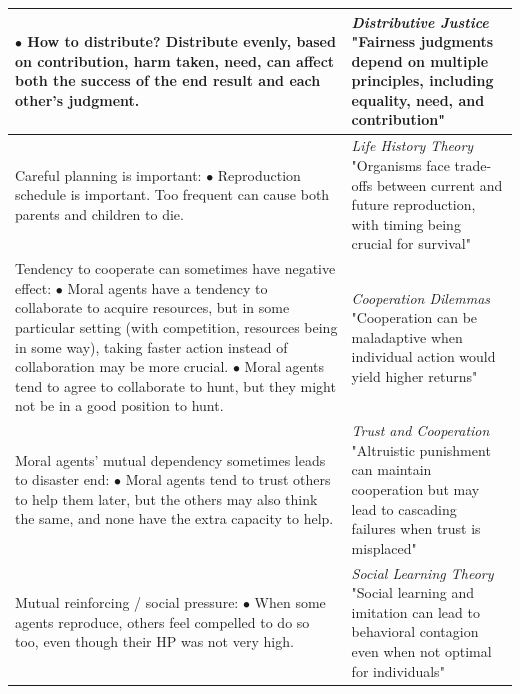 \begin{table}[tbp]
\begin{tabular}{p{7cm}p{7cm}}
{\hspace*{1em} $\bullet$ How to distribute? Distribute evenly, based on contribution, harm taken, need, can affect both the success of the end result and each other's judgment.} & 
\parbox[t]{7cm}{\textit{Distributive Justice} \citep{konow2003which} \\
"Fairness judgments depend on multiple principles, including equality, need, and contribution"} \\
\hline
\parbox[t]{7cm}{Careful planning is important: \\
\hspace*{1em} $\bullet$ Reproduction schedule is important. Too frequent can cause both parents and children to die.} & 
\parbox[t]{7cm}{\textit{Life History Theory} \citep{kaplan1992evolution} \\
"Organisms face trade-offs between current and future reproduction, with timing being crucial for survival"} \\
\hline
\parbox[t]{7cm}{Tendency to cooperate can sometimes have negative effect: \\ 
\hspace*{1em} $\bullet$ Moral agents have a tendency to collaborate to acquire resources, but in some particular setting (with competition, resources being in some way), taking faster action instead of collaboration may be more crucial. \\
\hspace*{1em} $\bullet$ Moral agents tend to agree to collaborate to hunt, but they might not be in a good position to hunt.} & 
\parbox[t]{7cm}{\textit{Cooperation Dilemmas} \citep{bowles2004evolution} \\
"Cooperation can be maladaptive when individual action would yield higher returns"} \\
\hline
\parbox[t]{7cm}{Moral agents' mutual dependency sometimes leads to disaster end: \\
\hspace*{1em} $\bullet$ Moral agents tend to trust others to help them later, but the others may also think the same, and none have the extra capacity to help.} & 
\parbox[t]{7cm}{\textit{Trust and Cooperation} \citep{fehr2002altruistic} \\
"Altruistic punishment can maintain cooperation but may lead to cascading failures when trust is misplaced"} \\
\hline
\parbox[t]{7cm}{Mutual reinforcing / social pressure: \\
\hspace*{1em} $\bullet$ When some agents reproduce, others feel compelled to do so too, even though their HP was not very high.} & 
\parbox[t]{7cm}{\textit{Social Learning Theory} \citep{bandura1977social} \\
"Social learning and imitation can lead to behavioral contagion even when not optimal for individuals"} \\
\hline
\end{tabular}
\end{table}